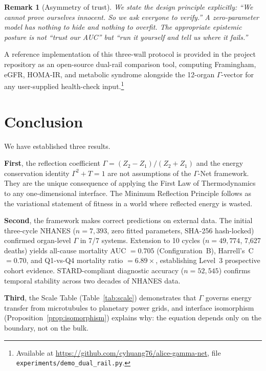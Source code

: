 \documentclass[aps,pre,twocolumn,superscriptaddress,floatfix]{revtex4-2}
\newtheorem{remark}{Remark}
\begin{document}
\begin{remark}[Asymmetry of trust]
We state the design principle explicitly:
\emph{``We cannot prove ourselves innocent.
So we ask everyone to verify.''}
A zero-parameter model has nothing to hide and nothing to overfit.
The appropriate epistemic posture is not ``trust our AUC'' but
``run it yourself and tell us where it fails.''
\end{remark}

A reference implementation of this three-wall protocol is provided
in the project repository as an open-source dual-rail comparison
tool, computing Framingham, eGFR, HOMA-IR, and metabolic syndrome
alongside the 12-organ $\Gamma$-vector for any user-supplied
health-check input.\footnote{Available at
\url{https://github.com/cyhuang76/alice-gamma-net},
file \texttt{experiments/demo\_dual\_rail.py}.}


\section{Conclusion}
\label{sec:conclusion}

We have established three results.

\textbf{First}, the reflection coefficient
$\Gamma=(Z_2-Z_1)/(Z_2+Z_1)$ and the energy conservation
identity $\Gamma^2+T=1$ are not assumptions of the
$\Gamma$-Net framework.  They are the unique consequence
of applying the First Law of Thermodynamics to any
one-dimensional interface.  The Minimum Reflection Principle
follows as the variational statement of fitness in a world
where reflected energy is wasted.

\textbf{Second}, the framework makes correct predictions
on external data.  The initial three-cycle NHANES
($n=7{,}393$, zero fitted parameters, SHA-256 hash-locked)
confirmed organ-level $\Gamma$ in 7/7 systems.
Extension to 10 cycles ($n=49{,}774$, 7,627 deaths)
yields all-cause mortality AUC $= 0.705$
(Configuration~B), Harrell's~C $= 0.70$,
and Q1-vs-Q4 mortality ratio $= 6.89\times$,
establishing Level~3 prospective cohort evidence.
STARD-compliant diagnostic accuracy ($n = 52{,}545$)
confirms temporal stability across two decades
of NHANES data.

\textbf{Third}, the Scale Table
(Table~\ref{tab:scale}) demonstrates that $\Gamma$ governs
energy transfer from microtubules to planetary power grids,
and interface isomorphism (Proposition~\ref{prop:isomorphism})
explains why: the equation depends only on the boundary,
not on the bulk.
\end{document}
